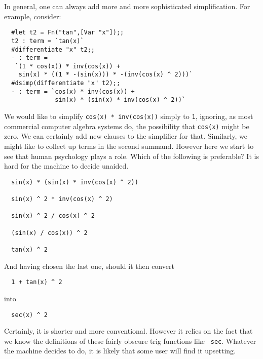 In general, one can always add more and more sophisticated simplification. For
example, consider:

\begin{boxed}\begin{verbatim}
  #let t2 = Fn("tan",[Var "x"]);;
  t2 : term = `tan(x)`
  #differentiate "x" t2;;
  - : term =
   `(1 * cos(x)) * inv(cos(x)) +
    sin(x) * ((1 * -(sin(x))) * -(inv(cos(x) ^ 2)))`
  #dsimp(differentiate "x" t2);;
  - : term = `cos(x) * inv(cos(x)) +
              sin(x) * (sin(x) * inv(cos(x) ^ 2))`
\end{verbatim}\end{boxed}

We would like to simplify {\tt cos(x) * inv(cos(x))} simply to {\tt 1},
ignoring, as most commercial computer algebra systems do, the possibility that
{\tt cos(x)} might be zero. We can certainly add new clauses to the simplifier
for that. Similarly, we might like to collect up terms in the second summand.
However here we start to see that human psychology plays a role. Which of the
following is preferable? It is hard for the machine to decide unaided.

\begin{boxed}\begin{verbatim}
  sin(x) * (sin(x) * inv(cos(x) ^ 2))

  sin(x) ^ 2 * inv(cos(x) ^ 2)

  sin(x) ^ 2 / cos(x) ^ 2

  (sin(x) / cos(x)) ^ 2

  tan(x) ^ 2
\end{verbatim}\end{boxed}

And having chosen the last one, should it then convert

\begin{boxed}\begin{verbatim}
  1 + tan(x) ^ 2
\end{verbatim}\end{boxed}

\noindent into

\begin{boxed}\begin{verbatim}
  sec(x) ^ 2
\end{verbatim}\end{boxed}

Certainly, it is shorter and more conventional. However it relies on the fact
that we know the definitions of these fairly obscure trig functions like {\tt
sec}. Whatever the machine decides to do, it is likely that some user will find
it upsetting.

